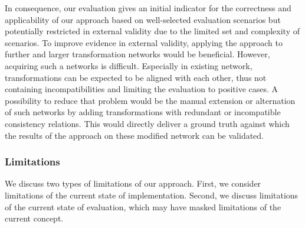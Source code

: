 
In consequence, our evaluation gives an initial indicator for the correctness and applicability of our approach based on well-selected evaluation scenarios but potentially restricted in external validity due to the limited set and complexity of scenarios.
To improve evidence in external validity, applying the approach to further and larger transformation networks would be beneficial.
However, acquiring such a networks is difficult.
Especially in existing network, transformations can be expected to be aligned with each other, thus not containing incompatibilities and limiting the evaluation to positive cases.
A possibility to reduce that problem would be the manual extension or alternation of such networks by adding transformations with redundant or incompatible consistency relations.
This would directly deliver a ground truth against which the results of the approach on these modified network can be validated.



\subsubsection{Limitations}
\label{chap:correctness_evaluation:compatibility:discussion:limitations}

We discuss two types of limitations of our approach.
First, we consider limitations of the current state of implementation.
Second, we discuss limitations of the current state of evaluation, which may have masked limitations of the current concept.

